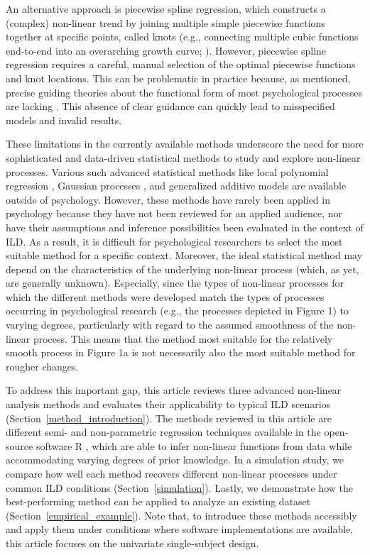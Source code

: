 \documentclass[man, floatsintext]{apa7}
\begin{document}
An alternative approach is piecewise spline regression, which constructs a
(complex) non-linear trend by joining multiple simple piecewise functions
together at specific points, called knots (e.g., connecting multiple cubic
functions end-to-end into an overarching growth curve;
\textcite{tsay_nonlinear_2019}). However, piecewise spline regression requires
a careful, manual selection of the optimal piecewise functions and knot
locations. This can be problematic in practice because, as mentioned, precise
guiding theories about the functional form of most psychological processes are
lacking \parencite{tan_time-varying_2011}. This absence of clear guidance can
quickly lead to misspecified models and invalid results.

These limitations in the currently available methods underscore the need for
more sophisticated and data-driven statistical methods to study and explore
non-linear processes. Various such advanced statistical methods like local
polynomial regression \parencite{fan_local_2018}, Gaussian processes
\parencite{rasmussen_gaussian_2006}, and generalized additive models
\parencite{wood_generalized_2006} are available outside of psychology. However,
these methods have rarely been applied in psychology because they have not been
reviewed for an applied audience, nor have their assumptions and inference
possibilities been evaluated in the context of ILD\@. As a result, it is
difficult for psychological researchers to select the most suitable method for
a specific context. Moreover, the ideal statistical method may depend on the
characteristics of the underlying non-linear process (which, as yet,  are
generally unknown). Especially, since the types of non-linear processes for
which the different methods were developed match the types of processes
occurring in psychological research (e.g., the processes depicted in Figure 1)
to varying degrees, particularly with regard to the assumed smoothness of the
non-linear process. This means that the method most suitable for the relatively
smooth process in Figure 1a is not necessarily also the most suitable method
for rougher changes.

To address this important gap, this article reviews three advanced non-linear
analysis methods and evaluates their applicability to typical ILD scenarios
(Section~\ref{method_introduction}). The methods reviewed in this article are
different semi- and non-parametric regression techniques available in the
open-source software R \parencite{R-base}, which are able to infer non-linear
functions from data while accommodating varying degrees of prior knowledge. In
a simulation study, we compare how well each method recovers different
non-linear processes under common ILD conditions (Section~\ref{simulation}).
Lastly, we demonstrate how the best-performing method can be applied to analyze
an existing dataset (Section~\ref{empirical_example}). Note that, to introduce
these methods accessibly and apply them under conditions where software
implementations are available, this article focuses on the univariate
single-subject design.
\end{document}
